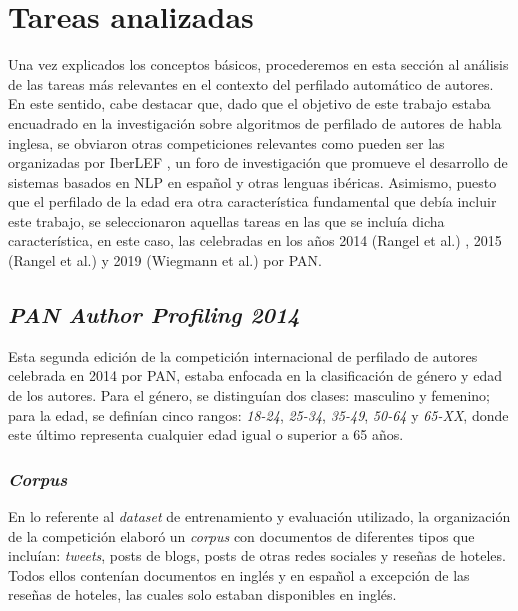 \section{Tareas analizadas}
\label{sec:competiciones_analizadas}

Una vez explicados los conceptos básicos, procederemos en esta sección al análisis de las tareas más relevantes en el contexto
del perfilado automático de autores. En este sentido, cabe destacar que, dado que el objetivo de este trabajo estaba encuadrado en
la investigación sobre algoritmos de perfilado de autores de habla inglesa, se obviaron otras competiciones relevantes como pueden ser
las organizadas por IberLEF \cite{iberlef}, un foro de investigación que promueve el desarrollo de sistemas basados en NLP en español y otras
lenguas ibéricas.
Asimismo, puesto que el perfilado de la edad era otra característica fundamental que debía incluir este trabajo, se seleccionaron aquellas tareas
en las que se incluía dicha característica, en este caso, las celebradas en los años 2014 (Rangel et al.) \cite{rangel2014overview}, 2015 (Rangel et al.) \cite{rangel2015overview} y 2019 (Wiegmann et al.) \cite{wiegmann2019overview}
por PAN.

\subsection{\textit{PAN Author Profiling 2014}}

Esta segunda edición de la competición internacional de perfilado de autores celebrada en 2014 por PAN, estaba enfocada en la clasificación de género y edad de los autores. Para el género, se distinguían dos clases:
masculino y femenino; para la edad, se definían cinco rangos: \textit{18-24}, \textit{25-34}, \textit{35-49}, \textit{50-64} y \textit{65-XX}, donde este último representa cualquier edad igual o superior a 65 años.

\subsubsection{\textit{Corpus}}

En lo referente al \textit{dataset} de entrenamiento y evaluación utilizado, la organización de la
competición elaboró un \textit{corpus} con documentos de diferentes tipos que incluían: \textit{tweets}, posts de blogs, posts de otras redes sociales y reseñas de hoteles.
Todos ellos contenían documentos en inglés y en español a excepción de las reseñas de hoteles, las cuales solo estaban disponibles en inglés.


